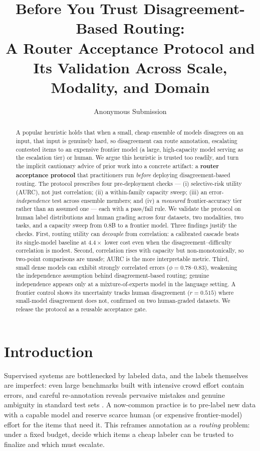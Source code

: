 \documentclass[letterpaper]{article} %
\title{Before You Trust Disagreement-Based Routing:\\
A Router Acceptance Protocol and Its Validation Across Scale, Modality, and Domain}
\author{
    Anonymous Submission
}
\begin{document}
\maketitle

\begin{abstract}
A popular heuristic holds that when a small, cheap ensemble of models disagrees
on an input, that input is genuinely hard, so disagreement can route annotation,
escalating contested items to an expensive frontier model (a large, high-capacity model serving as the escalation tier) or human. We argue this
heuristic is trusted too readily, and turn the implicit cautionary advice of prior
work into a concrete artifact: a \textbf{router acceptance protocol} that
practitioners run \emph{before} deploying disagreement-based routing. The protocol
prescribes four pre-deployment checks --- (i) selective-risk utility (AURC), not
just correlation; (ii) a within-family capacity sweep; (iii) an
error-\emph{independence} test across ensemble members; and (iv) a \emph{measured}
frontier-accuracy tier rather than an assumed one --- each with a pass/fail rule.
We validate the protocol on human label distributions and human grading across
four datasets, two modalities, two tasks, and a capacity sweep from $0.8$B to a
frontier model. Three findings justify the checks. First, routing utility can
\emph{decouple} from correlation: a calibrated cascade beats its single-model
baseline at $4.4\times$ lower cost even when the disagreement--difficulty
correlation is modest. Second, correlation rises with capacity but
non-monotonically, so two-point comparisons are unsafe; AURC is the more
interpretable metric. Third, small dense models can exhibit strongly correlated errors
($\phi{=}0.78$--$0.83$), weakening the independence assumption behind
disagreement-based routing; genuine independence appears only at a
mixture-of-experts model in the language setting. A frontier
control shows its uncertainty tracks human disagreement ($r{=}0.515$) where
small-model disagreement does not, confirmed on two human-graded datasets. We
release the protocol as a reusable acceptance gate.
\end{abstract}

\begin{links}
\end{links}

\section{Introduction}
Supervised systems are bottlenecked by labeled data, and the labels themselves
are imperfect: even large benchmarks built with intensive crowd effort
\citep{deng2009imagenet} contain errors, and careful re-annotation reveals
pervasive mistakes and genuine ambiguity in standard test sets
\citep{northcutt2021pervasive, beyer2020imagenet}.
A now-common practice is to pre-label new data with a capable model and reserve
scarce human (or expensive frontier-model) effort for the items that need it.
This reframes annotation as a \emph{routing} problem: under a fixed budget, decide
which items a cheap labeler can be trusted to finalize and which must escalate.
\end{document}
